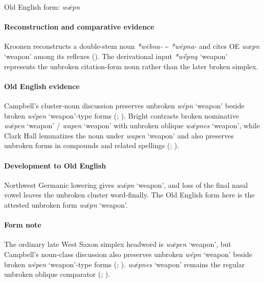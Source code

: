 \documentclass[
  british,
  a4paper,
]{article}
\providecommand{\Recon}[1]{\emph{*#1}}
\begin{document}
Old English form: \emph{wǣpn}

\paragraph{Reconstruction and comparative
evidence}\label{reconstruction-and-comparative-evidence-69}

Kroonen reconstructs a double-stem noun \emph{*wēbna-} \textasciitilde{}
\emph{*wēpna-} and cites OE \emph{wæpn} `weapon' among its reflexes
(). The derivational input
\Recon{wḗpną} `weapon' represents the unbroken citation-form noun rather
than the later broken simplex.

\paragraph{Old English evidence}\label{old-english-evidence-69}

Campbell's cluster-noun discussion preserves unbroken \emph{wépn}
`weapon' beside broken \emph{wépen} `weapon'-type forms
(;
). Bright contrasts broken
nominative \emph{wǣpen} `weapon' / \emph{wapen} `weapon' with unbroken
oblique \emph{wǣpnes} `weapon', while Clark Hall lemmatizes the noun
under \emph{wapen} `weapon' and also preserves unbroken forms in
compounds and related spellings
(;
).

\paragraph{Development to Old
English}\label{development-to-old-english-69}

Northwest Germanic lowering gives \emph{wǣpn} `weapon', and loss of the
final nasal vowel leaves the unbroken cluster word-finally. The Old
English form here is the attested unbroken form \emph{wǣpn} `weapon'.

\paragraph{Form note}\label{form-note-26}

The ordinary late West Saxon simplex headword is \emph{wǣpen} `weapon',
but Campbell's noun-class discussion also preserves unbroken \emph{wépn}
`weapon' beside broken \emph{wépen} `weapon'-type forms
(;
). \emph{wǣpnes} `weapon'
remains the regular unbroken oblique comparator
(;
).
\end{document}
